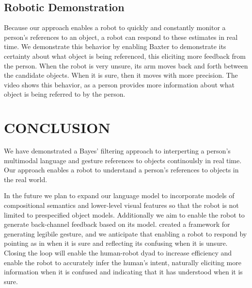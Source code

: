\documentclass[letterpaper, 10 pt, conference]{ieeeconf}
\begin{document}
\subsection{Robotic Demonstration}

Because our approach enables a robot to quickly and constantly monitor
a person's references to an object, a robot can respond to these
estimates in real time.  We demonstrate this behavior by enabling
Baxter to demonstrate its certainty about what object is being
referenced, this eliciting more feedback from the person.  When the
robot is very unsure, its arm moves back and forth between the
candidate objects.  When it is sure, then it moves with more
precision.  The video shows this behavior, as a person provides more
information about what object is being referred to by the person.

\section{CONCLUSION}

We have demonstrated a Bayes' filtering approach to interperting a
person's multimodal language and gesture references to objects
continoulsly in real time.  Our approach enables a robot to understand
a person's references to objects in the real world.

In the future we plan to expand our language model to incorporate
models of compositional semantics and lower-level visual features so
that the robot is not limited to prespecified object models.
Additionally we aim to enable the robot to generate back-channel
feedback based on its model.  \citet{dragan13} created a framework for
generating legibile gesture, and we anticipate that enabling a robot
to respond by pointing as in \citet{holladay14} when it is sure and
reflecting its confusing when it is unsure.  Closing the loop will
enable the human-robot dyad to increase efficiency and enable the
robot to accurately infer the human's intent, naturally eliciting more
information when it is confused and indicating that it has understood
when it is sure.




\end{document}
